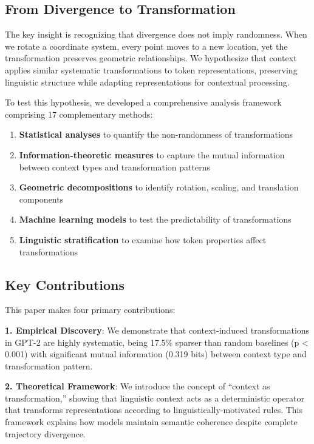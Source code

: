\documentclass[11pt]{article}
\begin{document}
\subsection{From Divergence to Transformation}

The key insight is recognizing that divergence does not imply randomness. When we rotate a coordinate system, every point moves to a new location, yet the transformation preserves geometric relationships. We hypothesize that context applies similar systematic transformations to token representations, preserving linguistic structure while adapting representations for contextual processing.

To test this hypothesis, we developed a comprehensive analysis framework comprising 17 complementary methods:

\begin{enumerate}
    \item \textbf{Statistical analyses} to quantify the non-randomness of transformations
    \item \textbf{Information-theoretic measures} to capture the mutual information between context types and transformation patterns
    \item \textbf{Geometric decompositions} to identify rotation, scaling, and translation components
    \item \textbf{Machine learning models} to test the predictability of transformations
    \item \textbf{Linguistic stratification} to examine how token properties affect transformations
\end{enumerate}

\subsection{Key Contributions}

This paper makes four primary contributions:

\textbf{1. Empirical Discovery}: We demonstrate that context-induced transformations in GPT-2 are highly systematic, being 17.5\% sparser than random baselines (p < 0.001) with significant mutual information (0.319 bits) between context type and transformation pattern.

\textbf{2. Theoretical Framework}: We introduce the concept of ``context as transformation,'' showing that linguistic context acts as a deterministic operator that transforms representations according to linguistically-motivated rules. This framework explains how models maintain semantic coherence despite complete trajectory divergence.
\end{document}
